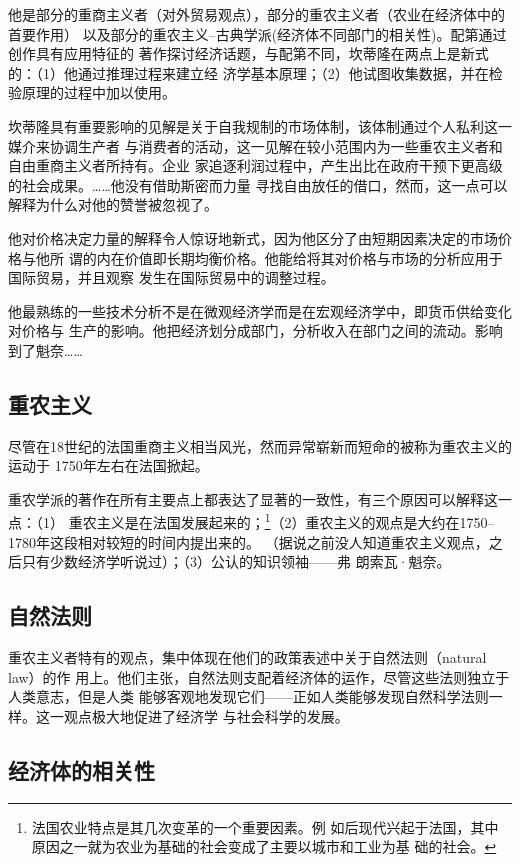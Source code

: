 他是部分的重商主义者（对外贸易观点），部分的重农主义者（农业在经济体中的首要作用）
以及部分的重农主义--古典学派(经济体不同部门的相关性)。配第通过创作具有应用特征的
著作探讨经济话题，与配第不同，坎蒂隆在两点上是新式的：（1）他通过推理过程来建立经
济学基本原理；（2）他试图收集数据，并在检验原理的过程中加以使用。

坎蒂隆具有重要影响的见解是关于自我规制的市场体制，该体制通过个人私利这一媒介来协调生产者
与消费者的活动，这一见解在较小范围内为一些重农主义者和自由重商主义者所持有。企业
家追逐利润过程中，产生出比在政府干预下更高级的社会成果。……他没有借助斯密而力量
寻找自由放任的借口，然而，这一点可以解释为什么对他的赞誉被忽视了。

他对价格决定力量的解释令人惊讶地新式，因为他区分了由短期因素决定的市场价格与他所
谓的内在价值即长期均衡价格。他能给将其对价格与市场的分析应用于国际贸易，并且观察
发生在国际贸易中的调整过程。

他最熟练的一些技术分析不是在微观经济学而是在宏观经济学中，即货币供给变化对价格与
生产的影响。他把经济划分成部门，分析收入在部门之间的流动。影响到了魁奈……

\subsection{重农主义}

尽管在18世纪的法国重商主义相当风光，然而异常崭新而短命的被称为重农主义的运动于
1750年左右在法国掀起。

重农学派的著作在所有主要点上都表达了显著的一致性，有三个原因可以解释这一点：（1）
重农主义是在法国发展起来的；\footnote{法国农业特点是其几次变革的一个重要因素。例
  如后现代兴起于法国，其中原因之一就为农业为基础的社会变成了主要以城市和工业为基
  础的社会。}（2）重农主义的观点是大约在1750--1780年这段相对较短的时间内提出来的。
（据说之前没人知道重农主义观点，之后只有少数经济学听说过）；（3）公认的知识领袖——弗
朗索瓦·魁奈。

\subsection{自然法则}

重农主义者特有的观点，集中体现在他们的政策表述中关于自然法则（natural law）的作
用上。他们主张，自然法则支配着经济体的运作，尽管这些法则独立于人类意志，但是人类
能够客观地发现它们——正如人类能够发现自然科学法则一样。这一观点极大地促进了经济学
与社会科学的发展。

\subsection{经济体的相关性}

